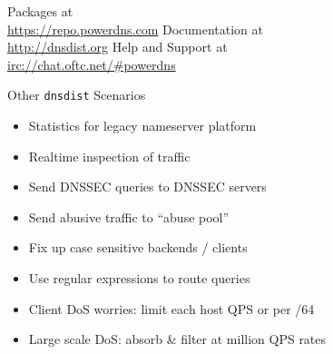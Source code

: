 \documentclass{beamer}
\begin{document}
\begin{frame}[standout]
  Packages at\\\url{https://repo.powerdns.com}
  \vfill
  Documentation at\\\url{http://dnsdist.org}
  \vfill
  Help and Support at\\\url{irc://chat.oftc.net/\#powerdns}
\end{frame}

\begin{frame}{Other \texttt{dnsdist} Scenarios}
  \begin{itemize}
    \item Statistics for legacy nameserver platform
    \item Realtime inspection of traffic
    \item Send DNSSEC queries to DNSSEC servers
    \item Send abusive traffic to ``abuse pool''
    \item Fix up case sensitive backends / clients
    \item Use regular expressions to route queries
    \item Client DoS worries: limit each host QPS or per /64
    \item Large scale DoS: absorb \& filter at million QPS rates
  \end{itemize}
\end{frame}
\end{document}

